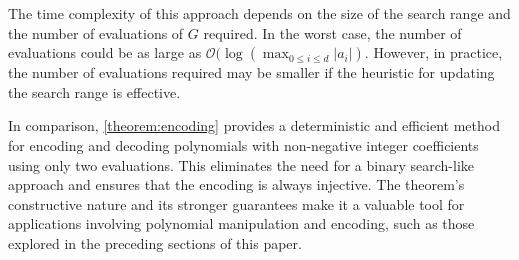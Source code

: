 \documentclass[11pt,reqno]{article}
\theoremstyle{plain}
\theoremstyle{definition}
\begin{document}
The time complexity of this approach depends on the size of the search range and the number of evaluations of $G$ required. In the worst case, the number of evaluations could be as large as $\mathcal{O}(\log(\max_{0 \leq i \leq d} |a_i|)$. However, in practice, the number of evaluations required may be smaller if the heuristic for updating the search range is effective.

In comparison, \cref{theorem:encoding} provides a deterministic and efficient method for encoding and decoding polynomials with non-negative integer coefficients using only two evaluations. This eliminates the need for a binary search-like approach and ensures that the encoding is always injective. The theorem's constructive nature and its stronger guarantees make it a valuable tool for applications involving polynomial manipulation and encoding, such as those explored in the preceding sections of this paper.

\begingroup
\raggedright


\endgroup
\end{document}
